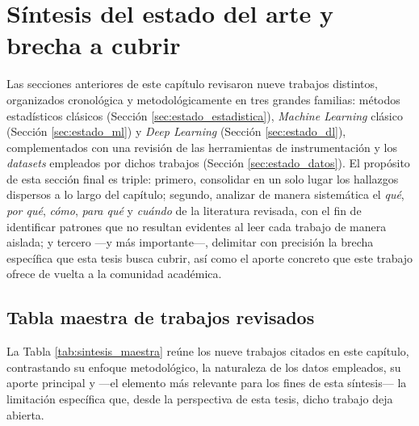 \documentclass[12pt]{report}
\begin{document}
\section{Síntesis del estado del arte y brecha a cubrir}
\label{sec:estado_brecha}

Las secciones anteriores de este capítulo revisaron nueve trabajos distintos, organizados cronológica y metodológicamente en tres grandes familias: métodos estadísticos clásicos (Sección \ref{sec:estado_estadistica}), \textit{Machine Learning} clásico (Sección \ref{sec:estado_ml}) y \textit{Deep Learning} (Sección \ref{sec:estado_dl}), complementados con una revisión de las herramientas de instrumentación y los \textit{datasets} empleados por dichos 
trabajos (Sección \ref{sec:estado_datos}). El propósito de esta sección final es triple: primero, consolidar en un solo lugar los hallazgos dispersos a lo largo del capítulo; segundo, analizar de manera sistemática el \textit{qué}, \textit{por qué}, \textit{cómo}, \textit{para qué} y \textit{cuándo} de la literatura revisada, con el fin de identificar patrones que no resultan evidentes al leer cada trabajo de manera aislada; y tercero ---y más 
importante---, delimitar con precisión la brecha específica que esta tesis busca cubrir, así como el aporte concreto que este trabajo ofrece de vuelta a la comunidad académica.

\subsection*{Tabla maestra de trabajos revisados}

La Tabla \ref{tab:sintesis_maestra} reúne los nueve trabajos citados en este capítulo, contrastando su enfoque metodológico, la naturaleza de los datos empleados, su aporte principal y ---el elemento más relevante para los fines de esta síntesis--- la limitación específica que, desde la perspectiva de esta tesis, dicho trabajo deja abierta.
\end{document}
